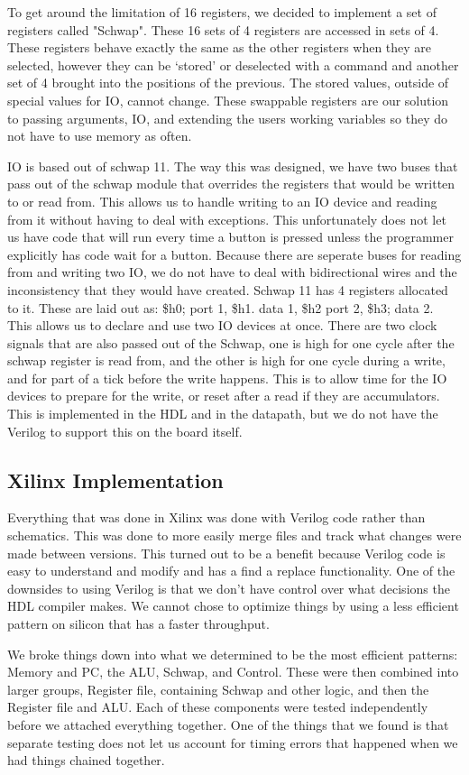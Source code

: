 \documentclass{report}
\begin{document}
			To get around the limitation of 16 registers, we decided to implement a set of registers called "Schwap". These 16 sets of 4 registers are accessed in sets of 4. These registers behave exactly the same as the other registers when they are selected, however they can be ‘stored’ or deselected with a command and another set of 4 brought into the positions of the previous. The stored values, outside of special values for IO, cannot change. These swappable registers are our solution to passing arguments, IO, and extending the users working variables so they do not have to use memory as often.\par
			IO is based out of schwap 11. The way this was designed, we have two buses that pass out of the schwap module that overrides the registers that would be written to or read from. This allows us to handle writing to an IO device and reading from it without having to deal with exceptions. This unfortunately does not let us have code that will run every time a button is pressed unless the programmer explicitly has code wait for a button. Because there are seperate buses for reading from and writing two IO, we do not have to deal with bidirectional wires and the inconsistency that they would have created. Schwap 11 has 4 registers allocated to it. These are laid out as: \$h0; port 1, \$h1. data 1, \$h2 port 2, \$h3; data 2. This allows us to declare and use two IO devices at once. There are two clock signals that are also passed out of the Schwap, one is high for one cycle after the schwap register is read from, and the other is high for one cycle during a write, and for part of a tick before the write happens. This is to allow time for the IO devices to prepare for the write, or reset after a read if they are accumulators. This is implemented in the HDL and in the datapath, but we do not have the Verilog to support this on the board itself.
		\subsection{Xilinx Implementation}
			Everything that was done in Xilinx was done with Verilog code rather than schematics. This was done to more easily merge files and track what changes were made between versions. This turned out to be a benefit because Verilog code is easy to understand and modify and has a find a replace functionality.  One of the downsides to using Verilog is that we don't have control over what decisions the HDL compiler makes. We cannot chose to optimize things by using a less efficient pattern on silicon that has a faster throughput.\par
			We broke things down into what we determined to be the most efficient patterns: Memory and PC, the ALU, Schwap, and Control. These were then combined into larger groups, Register file, containing Schwap and other logic, and then the Register file and ALU. Each of these components were tested independently before we attached everything together. One of the things that we found is that separate testing does not let us account for timing errors that happened when we had things chained together.
\end{document}
